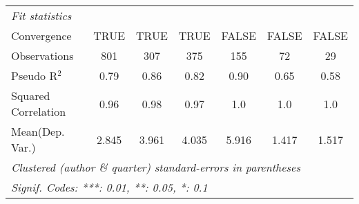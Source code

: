 \begin{tabular}{lcccccc}
   \midrule
   \emph{Fit statistics}\\
   Convergence                                                &TRUE         & TRUE          & TRUE       & FALSE     & FALSE         & FALSE\\  
   Observations                                               & 801         & 307           & 375        & 155       & 72            & 29\\  
   Pseudo R$^2$                                               & 0.79        & 0.86          & 0.82       & 0.90      & 0.65          & 0.58\\  
   Squared Correlation                                        & 0.96        & 0.98          & 0.97       & 1.0       & 1.0           & 1.0\\  
Mean(Dep. Var.) & 2.845 & 3.961 & 4.035 & 5.916 & 1.417 & 1.517 \\
   \midrule \midrule
   \multicolumn{7}{l}{\emph{Clustered (author \& quarter) standard-errors in parentheses}}\\
   \multicolumn{7}{l}{\emph{Signif. Codes: ***: 0.01, **: 0.05, *: 0.1}}\\
\end{tabular}
\par\endgroup
